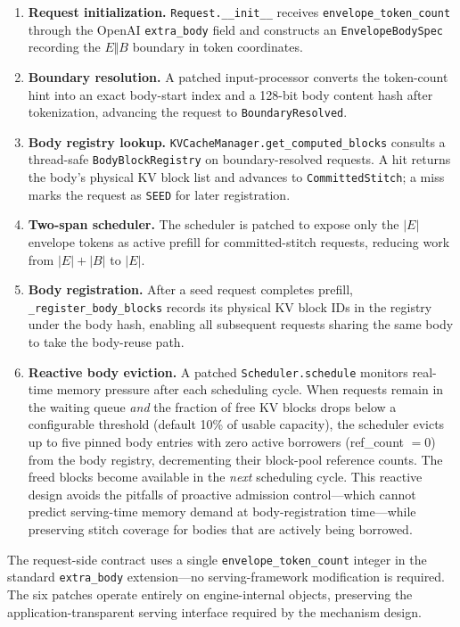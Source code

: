 \documentclass[conference]{IEEEtran}
\begin{document}
\begin{enumerate}[leftmargin=1.5em,itemsep=0pt]
\item \textbf{Request initialization.} \texttt{Request.\_\_init\_\_} receives \texttt{envelope\_token\_count} through the OpenAI \texttt{extra\_body} field and constructs an \texttt{EnvelopeBodySpec} recording the $E \Vert B$ boundary in token coordinates.
\item \textbf{Boundary resolution.} A patched input-processor converts the token-count hint into an exact body-start index and a 128-bit body content hash after tokenization, advancing the request to \texttt{BoundaryResolved}.
\item \textbf{Body registry lookup.} \texttt{KVCacheManager.get\_computed\_blocks} consults a thread-safe \texttt{BodyBlockRegistry} on boundary-resolved requests. A hit returns the body's physical KV block list and advances to \texttt{CommittedStitch}; a miss marks the request as \texttt{SEED} for later registration.
\item \textbf{Two-span scheduler.} The scheduler is patched to expose only the $|E|$ envelope tokens as active prefill for committed-stitch requests, reducing work from $|E|+|B|$ to $|E|$.
\item \textbf{Body registration.} After a seed request completes prefill, \texttt{\_register\_body\_blocks} records its physical KV block IDs in the registry under the body hash, enabling all subsequent requests sharing the same body to take the body-reuse path.
\item \textbf{Reactive body eviction.} A patched \texttt{Scheduler.schedule} monitors real-time memory pressure after each scheduling cycle. When requests remain in the waiting queue \emph{and} the fraction of free KV blocks drops below a configurable threshold (default 10\% of usable capacity), the scheduler evicts up to five pinned body entries with zero active borrowers (ref\_count $= 0$) from the body registry, decrementing their block-pool reference counts. The freed blocks become available in the \emph{next} scheduling cycle. This reactive design avoids the pitfalls of proactive admission control---which cannot predict serving-time memory demand at body-registration time---while preserving stitch coverage for bodies that are actively being borrowed.
\end{enumerate}

The request-side contract uses a single \texttt{envelope\_token\_count} integer in the standard \texttt{extra\_body} extension---no serving-framework modification is required. The six patches operate entirely on engine-internal objects, preserving the application-transparent serving interface required by the mechanism design.
\end{document}

